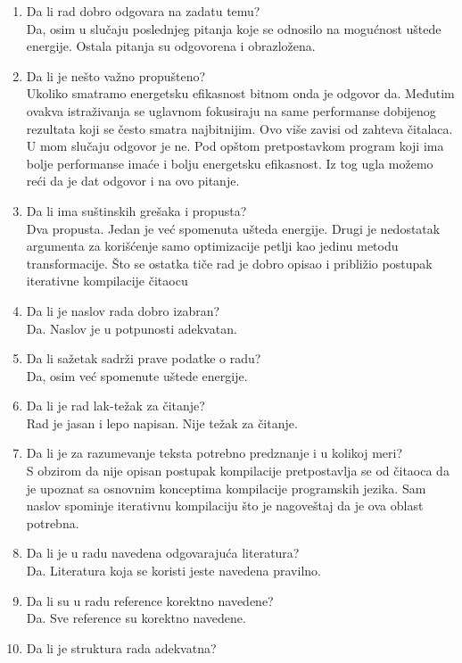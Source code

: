 \documentclass[a4paper]{report}
\begin{document}
\begin{enumerate}
\item Da li rad dobro odgovara na zadatu temu?\\
Da, osim u slučaju poslednjeg pitanja koje se odnosilo na mogućnost uštede energije. Ostala pitanja su odgovorena i obrazložena.
\item Da li je nešto važno propušteno?\\
Ukoliko smatramo energetsku efikasnost bitnom onda je odgovor da. Međutim ovakva istraživanja se uglavnom fokusiraju na same performanse dobijenog rezultata koji se često smatra najbitnijim. Ovo više zavisi od zahteva čitalaca. U mom slučaju odgovor je ne. Pod opštom pretpostavkom program koji ima bolje performanse imaće i bolju energetsku efikasnost. Iz tog ugla možemo reći da je dat odgovor i na ovo pitanje.
\item Da li ima suštinskih grešaka i propusta?\\
Dva propusta. Jedan je već spomenuta ušteda energije. Drugi je nedostatak argumenta za korišćenje samo optimizacije petlji kao jedinu metodu transformacije. Što se ostatka tiče rad je dobro opisao i približio postupak iterativne kompilacije čitaocu
\item Da li je naslov rada dobro izabran?\\
Da. Naslov je u potpunosti adekvatan.
\item Da li sažetak sadrži prave podatke o radu?\\
Da, osim već spomenute uštede energije.
\item Da li je rad lak-težak za čitanje?\\
Rad je jasan i lepo napisan. Nije težak za čitanje.
\item Da li je za razumevanje teksta potrebno predznanje i u kolikoj meri?\\
S obzirom da nije opisan postupak kompilacije pretpostavlja se od čitaoca da je upoznat sa osnovnim konceptima kompilacije programskih jezika. Sam naslov spominje iterativnu kompilaciju što je nagoveštaj da je ova oblast potrebna. 
\item Da li je u radu navedena odgovarajuća literatura?\\
Da. Literatura koja se koristi jeste navedena pravilno.
\item Da li su u radu reference korektno navedene?\\
Da. Sve reference su korektno navedene.
\item Da li je struktura rada adekvatna?\\

\end{enumerate}
\end{document}
